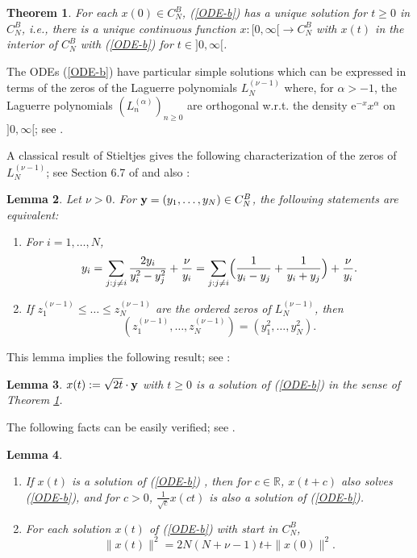 \documentclass[reqno]{amsart}
\theoremstyle{plain}
\newtheorem{theorem}{Theorem}[section]
\newtheorem{lemma}[theorem]{Lemma}
\theoremstyle{definition}
\numberwithin{equation}{section}
\begin{document}
\begin{theorem}\label{ode-ex-unique-b-thm}
For each $x(0)\in C_N^B$,  (\ref{ODE-b})
has a unique solution for  $t\ge0$ in  $ C_N^B$, i.e.,
 there is a unique continuous function
$x:[0,\infty[\to C_N^B$ with  $x(t)$ in the interior of  $ C_N^B$ 
with  (\ref{ODE-b}) for $t\in]0,\infty[$.
\end{theorem}

The ODEs
(\ref{ODE-b}) have  particular simple solutions which can be expressed in terms of the  zeros of the Laguerre polynomials
 $L_N^{(\nu-1)}$ where, for $\alpha>-1$, the  Laguerre polynomials $(L_n^{(\alpha)})_{n\ge 0}$  are orthogonal w.r.t.
 the density  $\mathrm{e}^{-x}x^{\alpha}$ on $]0,\infty[$; see  \cite{S}.
 
 A classical result of Stieltjes gives the following characterization of the zeros of $L_N^{(\nu-1)}$; see Section 6.7 of \cite{S} and also
  \cite{AKM2,AV1, V}:

\begin{lemma}\label{char-zero-B1}
Let $\nu>0$. For ${\bf y}=(y_1,\ldots,y_N)\in C_N^B$, the following statements  are equivalent:
\begin{enumerate}
\item[\rm{(1)}]  For $i=1,\ldots,N$, 
$$y_i=\sum_{j: j\ne i} \frac{2y_i}{y_i^2-y_j^2} +\frac{\nu}{y_i}=\sum_{j: j\ne i} \Bigl(
  \frac{1}{y_i-y_j} +\frac{1}{y_i+y_j}\Bigr) +\frac{\nu}{y_i}  .$$
\item[\rm{(2)}]  If $z_1^{(\nu-1)}\le\ldots\le z_N^{(\nu-1)}$ are the ordered zeros of $L_N^{(\nu-1)}$, then 
$$(z_1^{(\nu-1)},\ldots, z_N^{(\nu-1)})= (y_1^2, \ldots, y_N^2).$$
\end{enumerate}
\end{lemma}

This lemma  implies the following result; see  \cite{AV1, VW1, VW2, VW3}:


\begin{lemma}\label{special-solution-b}
 $x(t):=\sqrt{2t}\cdot{\bf y}  $ with $t\ge0$ is a solution of (\ref{ODE-b}) in the sense of Theorem \ref{ode-ex-unique-b-thm}.
\end{lemma}

The following facts can be  easily verified; see \cite{VW3}.


\begin{lemma}\label{prp-b}
\begin{enumerate}
  \item[\rm{(1)}] If $x(t)$ is a solution of
  (\ref{ODE-b}) , then for  $c\in\mathbb R$,
  $x(t+c)$ also solves  (\ref{ODE-b}), and for $c>0$,  $\frac{1}{\sqrt c} x(ct)$ is also a
    solution of  (\ref{ODE-b}).
\item[\rm{(2)}] For each solution $x(t)$ of  (\ref{ODE-b}) with start in  $ C_N^B$,
\begin{equation}\label{ODE-norm-b}
\|x(t)\|^2 =2N(N+\nu-1)t+\|x(0)\|^2.
\end{equation}
\end{enumerate}
\end{lemma}
\end{document}
